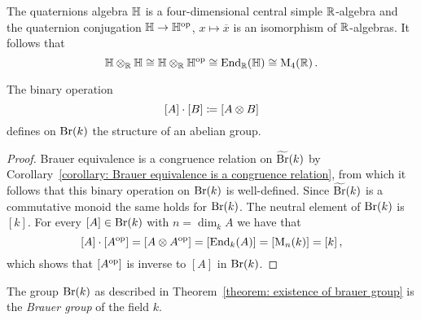

\begin{example}
  The quaternions algebra $\mathbb{H}$ is a four-dimensional central simple $\mathbb{R}$-algebra and the quaternion conjugation $\mathbb{H} \to \mathbb{H}^{\mathrm{op}}$, $x \mapsto \overline{x}$ is an isomorphism of $\mathbb{R}$-algebras.
  It follows that
  \[
          \mathbb{H} \otimes_{\mathbb{R}} \mathbb{H}
    \cong \mathbb{H} \otimes_{\mathbb{R}} \mathbb{H}^{\mathrm{op}}
    \cong \operatorname{End}_{\mathbb{R}}(\mathbb{H})
    \cong \operatorname{M}_4(\mathbb{R}) \,.
  \]
\end{example}


\begin{theorem}
  \label{theorem: existence of brauer group}
  The binary operation
  \[
              [A] \cdot [B]
    \coloneqq  [A \otimes B]
  \]
  defines on $\operatorname{Br}(k)$ the structure of an abelian group.
\end{theorem}


\begin{proof}
  Brauer equivalence is a congruence relation on $\widetilde{\operatorname{Br}}(k)$ by Corollary~\ref{corollary: Brauer equivalence is a congruence relation}, from which it follows that this binary operation on $\operatorname{Br}(k)$ is well-defined.
  Since $\widetilde{\operatorname{Br}}(k)$ is a commutative monoid the same holds for $\operatorname{Br}(k)$.
  The neutral element of $\operatorname{Br}(k)$ is $[k]$.
  For every $[A] \in \operatorname{Br}(k)$ with $n = \dim_k A$ we have that
  \[
      [A] \cdot [A^{\mathrm{op}}]
    = [A \otimes A^{\mathrm{op}}]
    = [\operatorname{End}_k(A)]
    = [\operatorname{M}_n(k)]
    = [k] \,,
  \]
  which shows that $[A^{\mathrm{op}}]$ is inverse to $[A]$ in $\operatorname{Br}(k)$.
\end{proof}


\begin{definition}
  The group $\operatorname{Br}(k)$ as described in Theorem~\ref{theorem: existence of brauer group} is the \emph{Brauer group} of the field $k$.
\end{definition}


